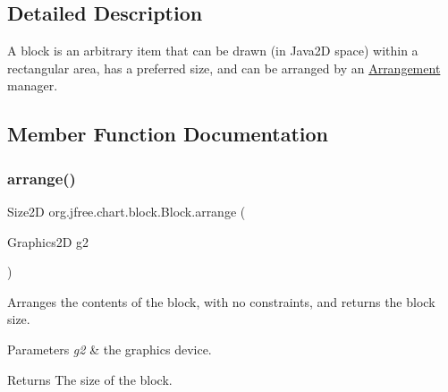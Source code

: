 \subsection{Detailed Description}
A block is an arbitrary item that can be drawn (in Java2D space) within a rectangular area, has a preferred size, and can be arranged by an \mbox{\hyperlink{interfaceorg_1_1jfree_1_1chart_1_1block_1_1_arrangement}{Arrangement}} manager. 

\subsection{Member Function Documentation}
\mbox{\label{interfaceorg_1_1jfree_1_1chart_1_1block_1_1_block_a651d16c17fbf75d569fd29cf49ee8b9a}} 
\subsubsection{\texorpdfstring{arrange()}{arrange()}\hspace{0.1cm}{\footnotesize\ttfamily [1/2]}}
{\footnotesize\ttfamily Size2D org.\+jfree.\+chart.\+block.\+Block.\+arrange (\begin{DoxyParamCaption}\item[{Graphics2D}]{g2 }\end{DoxyParamCaption})}

Arranges the contents of the block, with no constraints, and returns the block size.


\begin{DoxyParams}{Parameters}
{\em g2} & the graphics device.\\
\hline
\end{DoxyParams}
\begin{DoxyReturn}{Returns}
The size of the block. 
\end{DoxyReturn}
\mbox{\label{interfaceorg_1_1jfree_1_1chart_1_1block_1_1_block_ab4cabbc237c5277a4a0018bab930e5fe}} 
